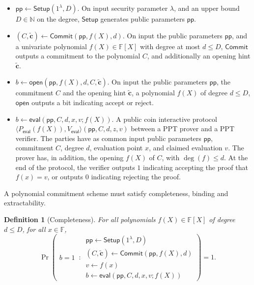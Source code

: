 \documentclass[sigconf]{acmart}
\newtheorem{definition}{Definition}[section]
\newcommand{\F}{\mathbb{F}}
\newcommand{\pp}{\mathsf{pp}}
\newcommand{\pcsetup}{\mathsf{Setup}}
\newcommand{\pccommit}{\mathsf{Commit}}
\newcommand{\pcopen}{\mathsf{open}}
\newcommand{\pceval}{\mathsf{eval}}
\newcommand{\pccheck}{\mathsf{check}}
\newcommand{\secp}{\ensuremath{\lambda}}
\begin{document}
		\begin{itemize}
			\item $\pp \leftarrow \pcsetup(1^\secp,D) $. On input security parameter $\secp$, and an upper bound $D \in \mathbb{N}$ on the degree, $\pcsetup$ generates public parameters $\pp$.
			
			\item $(C,\mathbf{\tilde{c}}) \leftarrow \pccommit(\pp, f(X),d) $. On input the public parameters $\pp$, and a univariate polynomial $f(X) \in \F[X]$ with degree at most $d \leq D$, $\pccommit$ outputs a commitment to the polynomial $C$, and additionally an opening hint $\mathbf{\tilde{c}}$.
			
			\item $b \leftarrow \pcopen(\pp,f(X),d,C,\mathbf{\tilde{c}})$. On input the public parameters $\pp$, the commitment $C$ and the opening hint $\mathbf{\tilde{c}}$, a polynomial $f(X)$ of degree $d \leq D$, $\pcopen$ outputs a bit indicating accept or reject. 
			
			\item $b \leftarrow \pceval(\pp,C,d,x,v;f(X)) $. A public coin interactive protocol 
			$\langle P_{\mathsf{eval}}(f(X)), V_{\mathsf{eval}} \rangle(\pp,C,d,z,v)$ between a PPT prover and a PPT verifier. The parties have as common input public parameters $\pp$, commitment $C$, degree $d$, evaluation point $x$, and claimed evaluation $v$. The prover has, in addition, the opening $f(X)$ of $C$, with $\deg(f) \leq d$. At the end of the protocol, the verifier outputs $1$ indicating accepting the proof that $f(x)=v$, or outputs $0$ indicating rejecting the proof.
			
		\end{itemize}
		
		A polynomial commitment scheme must satisfy completeness, binding and extractability.
		
		\begin{definition}[Completeness]
			\label{def:pcs-comp}
			For all polynomials $f(X) \in \F[X]$ of degree $d \leq D$, for all $x \in \F$,
			\[
			\Pr \left( 
			\begin{matrix}
				b=1
			\end{matrix}
			\,:\,
			\begin{matrix}
				\pp \leftarrow \pcsetup(1^\secp,D) \\
				(C,\mathbf{\tilde{c}}) \leftarrow \pccommit(\pp, f(X),d) \\
				v \leftarrow f(x) \\
				b \leftarrow \pceval(\pp,C,d,x,v;f(X))
			\end{matrix}
			\right) = 1.
			\]
		\end{definition}
		
\end{document}

